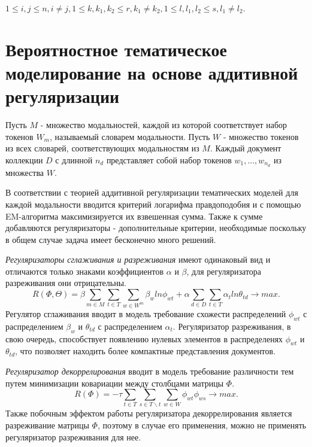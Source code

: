 \documentclass[12pt]{article}
\begin{document}
$1 \leq i,j \leq n, i \neq j, 1 \leq k, k_{1}, k_{2} \leq r, k_{1} \neq k_{2}, 1 \leq l, l_{1},l_{2} \leq s, l_{1} \neq l_{2}.$


\section{Вероятностное тематическое моделирование на основе аддитивной регуляризации}

Пусть $M$ - множество модальностей, каждой из которой соответствует набор токенов $W_{m}$, называемый словарем модальности. Пусть $W$ - множество токенов из всех словарей, соответствующих модальностям из $M$. Каждый документ коллекции $D$ с длинной ${n_{d}}$  представляет собой набор токенов $w_{1},...,w_{n_{d}}$ из множества $W$.

В соответствии с теорией аддитивной регуляризации тематических моделей для каждой модальности вводится критерий логарифма правдоподобия и с помощью EM-алгоритма максимизируется их взвешенная сумма. Также к сумме добавляются регуляризаторы - дополнительные критерии, необходимые поскольку в общем случае задача имеет бесконечно много решений.

\emph{Регуляризаторы сглаживания и разреживания} имеют одинаковый вид и отличаются только знаками коэффициентов $\alpha$ и $\beta$, для регуляризатора разреживания они отрицательны.
\begin{equation}
R(\Phi,\Theta)=\beta \sum_{m \in M}\sum_{t \in T}\sum_{w \in W^m} \beta_{w} ln \phi_{wt} + \alpha \sum_{d \in D}\sum_{t \in T}\alpha_{t} ln\theta_{td}\to max.
\end{equation} 
Регулятор сглаживания вводит в модель требование схожести распределений $\phi_{wt}$ с распределением $\beta_{w}$ и $\theta_{td}$ с распределением $\alpha_{t}$. Регуляризатор разреживания, в свою очередь, способствует появлению нулевых элементов в распределенях $\phi_{wt}$ и $\theta_{td}$, что позволяет находить более компактные представления документов.

\emph{Регуляризатор декоррелирования} вводит в модель требование различности тем путем минимизации ковариации между столбцами матрицы $\Phi$.
\begin{equation}
R(\Phi)=-\tau \sum_{t \in T}\sum_{s \in T\backslash t}\sum_{w \in W} \phi_{wt}\phi_{ws} \to max.
\end{equation} 
Также побочным эффектом работы регуляризатора декоррелирования является разреживание матрицы $\Phi$, поэтому в случае его применения, можно не применять регуляризатор разреживания для нее.
\end{document}
